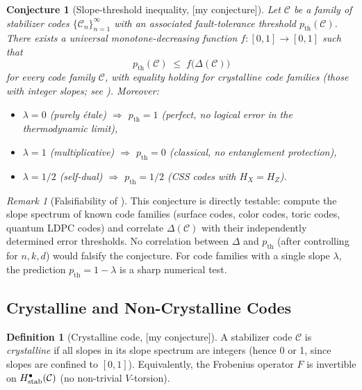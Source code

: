 \documentclass[12pt]{article}
\theoremstyle{definition}
\newtheorem{definition}{Definition}[section]
\theoremstyle{plain}
\newtheorem{conjecture}{Conjecture}[section]
\theoremstyle{remark}
\newtheorem{remark}{Remark}[section]
\newcommand{\myconj}{{\color{orange}[\textsf{my conjecture}]}}
\newcommand{\cC}{\mathcal{C}}
\begin{document}
\begin{conjecture}[Slope-threshold inequality, \myconj]\label{conj:slope-threshold}
Let $\cC$ be a family of stabilizer codes $\{\cC_n\}_{n=1}^{\infty}$ with an associated fault-tolerance threshold $p_{\mathrm{th}}(\cC)$. There exists a universal monotone-decreasing function $f:[0,1]\to[0,1]$ such that
\[
p_{\mathrm{th}}(\cC)\;\leq\;f\bigl(\Delta(\cC)\bigr)
\]
for every code family $\cC$, with equality holding for \emph{crystalline} code families (those with integer slopes; see ). Moreover:
\begin{itemize}[nosep]
  \item $\lambda=0$ (purely \'{e}tale) $\Longrightarrow$ $p_{\mathrm{th}}=1$ (perfect, no logical error in the thermodynamic limit),
  \item $\lambda=1$ (multiplicative) $\Longrightarrow$ $p_{\mathrm{th}}=0$ (classical, no entanglement protection),
  \item $\lambda=1/2$ (self-dual) $\Longrightarrow$ $p_{\mathrm{th}}=1/2$ (CSS codes with $H_X=H_Z$).
\end{itemize}
\end{conjecture}

\begin{remark}[Falsifiability of ]
This conjecture is directly testable: compute the slope spectrum of known code families (surface codes, color codes, toric codes, quantum LDPC codes) and correlate $\Delta(\cC)$ with their independently determined error thresholds. No correlation between $\Delta$ and $p_{\mathrm{th}}$ (after controlling for $n,k,d$) would falsify the conjecture. For code families with a single slope $\lambda$, the prediction $p_{\mathrm{th}}=1-\lambda$ is a sharp numerical test.
\end{remark}

\subsection{Crystalline and Non-Crystalline Codes}

\begin{definition}[Crystalline code, \myconj]\label{def:crystalline-code}
A stabilizer code $\cC$ is \emph{crystalline} if all slopes in its slope spectrum are integers (hence 0 or 1, since slopes are confined to $[0,1]$). Equivalently, the Frobenius operator $F$ is invertible on $H^{\bullet}_{\textup{stab}}(\cC)$ (no non-trivial $V$-torsion).
\end{definition}
\end{document}
